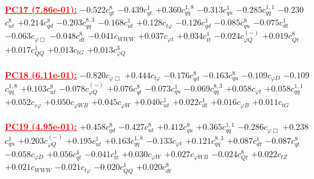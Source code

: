 \documentclass{article}
\begin{document}
\noindent \textcolor{red}{\underline{\bf{PC17} (7.86e-01):}}
{$-0.522$}{\rm $c_{qt}^{8}$} 
{$-0.439$}{\rm $c_{qt}^{1}$} 
{$+0.360$}{\rm $c_{qq}^{1,8}$} 
{$-0.313$}{\rm $c_{qu}^{1}$} 
{$-0.285$}{\rm $c_{qq}^{1,1}$} 
{$-0.230$}{\rm $c_{ut}^{8}$} 
{$+0.214$}{\rm $c_{qd}^{8}$} 
{$-0.203$}{\rm $c_{qq}^{8,3}$} 
{$-0.168$}{\rm $c_{ut}^{1}$} 
{$+0.128$}{\rm $c_{t \varphi}$} 
{$-0.126$}{\rm $c_{qd}^{1}$} 
{$-0.085$}{\rm $c_{qu}^{8}$} 
{$-0.075$}{\rm $c_{dt}^{1}$} 
{$-0.063$}{\rm $c_{\varphi \Box}$} 
{$-0.048$}{\rm $c_{dt}^{8}$} 
{$-0.041$}{\rm $c_{WWW}$} 
{$+0.037$}{\rm $c_{\varphi t}$} 
{$+0.034$}{\rm $c_{tt}^{1}$} 
{$-0.024$}{\rm $c_{\varphi Q}^{(-)}$} 
{$+0.019$}{\rm $c_{Qt}^{8}$} 
{$+0.017$}{\rm $c_{QQ}^{1}$} 
{$+0.013$}{\rm $c_{tG}$} 
{$+0.013$}{\rm $c_{\varphi Q}^{3}$} 
 \nonumber \\ \nonumber \\ 
\noindent \textcolor{red}{\underline{\bf{PC18} (6.11e-01):}}
{$-0.820$}{\rm $c_{\varphi \Box}$} 
{$+0.444$}{\rm $c_{t \varphi}$} 
{$-0.176$}{\rm $c_{qd}^{8}$} 
{$-0.163$}{\rm $c_{qu}^{8}$} 
{$-0.109$}{\rm $c_{\varphi D}$} 
{$-0.109$}{\rm $c_{qq}^{1,8}$} 
{$+0.103$}{\rm $c_{ut}^{8}$} 
{$-0.078$}{\rm $c_{\varphi Q}^{(-)}$} 
{$+0.076$}{\rm $c_{qt}^{8}$} 
{$-0.073$}{\rm $c_{qu}^{1}$} 
{$-0.069$}{\rm $c_{qq}^{8,3}$} 
{$+0.058$}{\rm $c_{\varphi t}$} 
{$+0.058$}{\rm $c_{qq}^{1,1}$} 
{$+0.052$}{\rm $c_{c \varphi}$} 
{$+0.050$}{\rm $c_{\varphi WB}$} 
{$+0.045$}{\rm $c_{\varphi W}$} 
{$+0.040$}{\rm $c_{ut}^{1}$} 
{$+0.022$}{\rm $c_{dt}^{1}$} 
{$+0.016$}{\rm $c_{\varphi B}$} 
{$+0.011$}{\rm $c_{tG}$} 
 \nonumber \\ \nonumber \\ 
\noindent \textcolor{red}{\underline{\bf{PC19} (4.95e-01):}}
{$+0.458$}{\rm $c_{qd}^{8}$} 
{$-0.427$}{\rm $c_{ut}^{8}$} 
{$+0.412$}{\rm $c_{qu}^{8}$} 
{$+0.365$}{\rm $c_{qq}^{1,1}$} 
{$-0.286$}{\rm $c_{\varphi \Box}$} 
{$+0.238$}{\rm $c_{qu}^{1}$} 
{$+0.203$}{\rm $c_{\varphi Q}^{(-)}$} 
{$+0.195$}{\rm $c_{ut}^{1}$} 
{$+0.163$}{\rm $c_{qq}^{1,8}$} 
{$-0.133$}{\rm $c_{\varphi t}$} 
{$+0.121$}{\rm $c_{qq}^{8,3}$} 
{$+0.087$}{\rm $c_{dt}^{1}$} 
{$-0.087$}{\rm $c_{qt}^{8}$} 
{$-0.058$}{\rm $c_{\varphi D}$} 
{$+0.056$}{\rm $c_{qt}^{1}$} 
{$-0.041$}{\rm $c_{tt}^{1}$} 
{$+0.030$}{\rm $c_{\varphi W}$} 
{$+0.027$}{\rm $c_{\varphi WB}$} 
{$-0.024$}{\rm $c_{Qt}^{8}$} 
{$+0.022$}{\rm $c_{tZ}$} 
{$+0.021$}{\rm $c_{WWW}$} 
{$-0.021$}{\rm $c_{t \varphi}$} 
{$-0.020$}{\rm $c_{QQ}^{1}$} 
{$+0.020$}{\rm $c_{dt}^{8}$} 
 \nonumber \\ \nonumber \\ 
\end{document}
